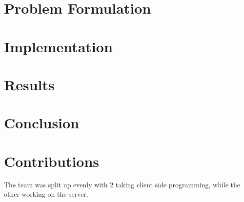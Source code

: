 \documentclass[11pt, journal]{IEEEtran}
\begin{document}
\section{Problem Formulation }


\section{Implementation}


\section{Results}


\section{Conclusion}


\section{Contributions}
The team was split up evenly with 2 taking client side programming, while the other working on the server.



\end{document}
